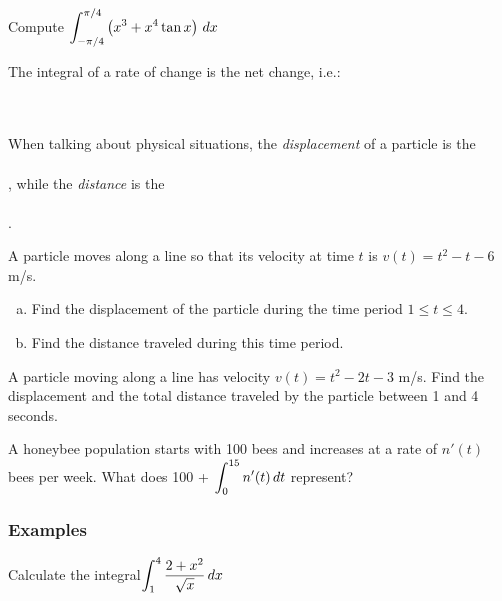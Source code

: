 \documentclass[notes]{subfiles}
\begin{document}
		\begin{ex}
			Compute \(\displaystyle \int_{-\pi/4}^{\pi/4} \left( x^3 + x^4 \tan x\right)\, dx\)
		\end{ex}
			\newpage
			
		\begin{thm}
			The integral of a rate of change is the net change, i.e.:
				\\ \\ \\ 
		\end{thm}
			
		\begin{rmk}
			When talking about physical situations, the \emph{displacement} of a particle is the
				 \\ \\ , while the \emph{distance} is the 
				 \\ \\ .
		\end{rmk}
			
		\begin{ex}
			A particle moves along a line so that its velocity at time \(t\) is \(v(t) = t^2-t-6\) m/s. 
			\begin{enumerate}[(a)]
				\item Find the displacement of the particle during the time period \(1\leq t\leq 4\).
					
				\item Find the distance traveled during this time period.
					
			\end{enumerate}
		\end{ex}
			\newpage
			
		\begin{ex}
			A particle moving along a line has velocity \(v(t) = t^2 -2t-3\) m/s.  Find the displacement and the total distance traveled by the particle between 1 and 4 seconds.
		\end{ex}
			\vs{1}
			
		\begin{ex}
			A honeybee population starts with 100 bees and increases at a rate of \(n'(t)\) bees per week.  What does 100 + \(\displaystyle \int_0^{15}n'(t)\,dt\) represent?
		\end{ex}
			\vs{1}
			
	\subsubsection*{Examples}
		\begin{ex}
			Calculate the integral\(\displaystyle \int_1^4 \dfrac{2+x^2}{\sqrt{x}}\,dx\)
		\end{ex}
			\vs{1}
			\newpage
			
\end{document}
